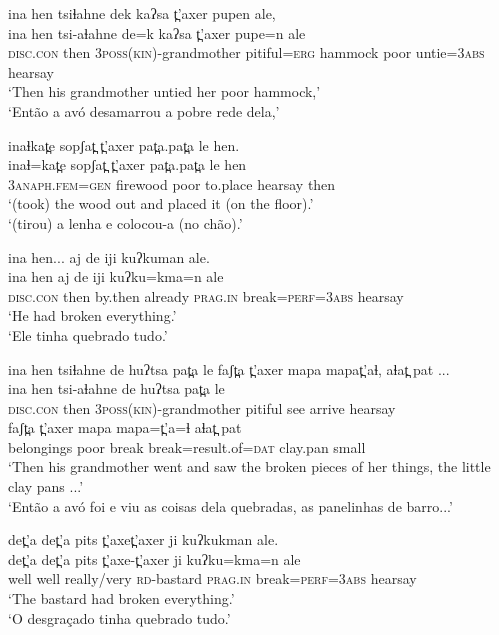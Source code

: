 \documentclass[output=paper,
modfonts,nonflat
]{langsci/langscibook}
\begin{document}
\ea ina hen tsiɬahne dek kaʔsa t̪'axer pupen ale,\\ [.3em]
\gll ina hen  tsi-aɬahne de=k  kaʔsa t̪'axer pupe=n ale\\
\textsc{disc.con}  then   \textsc{3poss(kin)}-grandmother  pitiful=\textsc{erg}  hammock  poor    untie=\textsc{3abs}  hearsay\\
\glt `Then his grandmother untied her poor hammock,'\\
‘Então a avó desamarrou a pobre rede dela,’
\z

\ea inaɬkat̪e sopʃat̪  t̪'axer pat̪a.pat̪a le hen.\\[.3em]
\gll inaɬ=kat̪e  sopʃat̪  t̪'axer  pat̪a.pat̪a  le  hen\\
\textsc{3anaph.fem}=\textsc{gen}  firewood   poor   to.place  hearsay  then\\
\glt `(took) the wood out and placed it (on the floor).'\\
‘(tirou) a lenha e colocou-a (no chão).’
\z

\ea ina hen... aj de iji kuʔkuman ale.\\[.3em]
\gll ina hen aj de iji  kuʔku=kma=n ale\\
\textsc{disc.con}  then  by.then  already  \textsc{prag.in}  break=\textsc{perf}=\textsc{3abs}  hearsay\\
\glt `He had broken everything.'\\
‘Ele tinha quebrado tudo.’
\z

\ea ina hen tsiɬahne de huʔtsa pat̪a le faʃt̪a t̪'axer mapa mapat̪'aɬ, aɬat̪ pat ...\\[.3em]
\gll ina hen   tsi-aɬahne  de huʔtsa pat̪a le\\
\textsc{disc.con} then  \textsc{3poss(kin)}-grandmother  pitiful see arrive  hearsay\\   



\gll faʃt̪a t̪'axer mapa mapa=t̪'a=ɬ aɬat̪ pat\\
belongings poor break break=result.of=\textsc{dat} clay.pan  small\\
\glt `Then his grandmother went and saw the broken pieces of her things, the little clay pans ...'\\
‘Então a avó foi e viu as coisas dela quebradas, as panelinhas de barro...’
\z

\ea det̪'a det̪'a pits t̪'axet̪'axer ji kuʔkukman ale.\\[.3em]
\gll det̪'a  det̪'a pits t̪'axe-t̪'axer ji  kuʔku=kma=n ale\\
well well really/very \textsc{rd}-bastard \textsc{prag.in}  break=\textsc{perf}=\textsc{3abs}  hearsay\\
\glt `The bastard had broken everything.'\\
‘O desgraçado tinha quebrado tudo.’
\z
\end{document}
